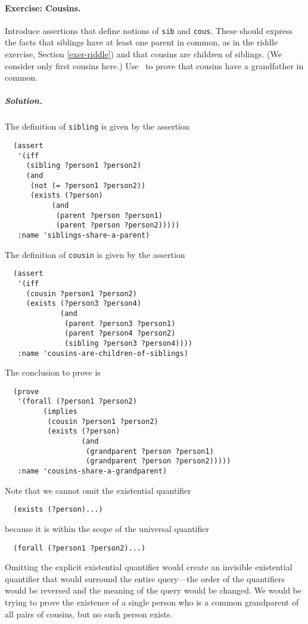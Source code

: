 \paragraph{Exercise: Cousins.}
\label{exer-cousins}
Introduce assertions that define notions of {\tt sib} and
{\tt cous}.  These should express the facts that siblings
have at least one parent in common, as in the riddle
exercise, Section \ref{exer-riddle}) and that cousins are children of
siblings.  (We consider only first cousins here.)
Use \snark\  to prove that cousins have a grandfather in common.
\subparagraph{Solution.}  The definition of {\tt sibling} is given by the
assertion
\begin{verbatim}
  (assert
   '(iff
     (sibling ?person1 ?person2)
     (and
      (not (= ?person1 ?person2))
      (exists (?person)
           (and
            (parent ?person ?person1)
            (parent ?person ?person2)))))
   :name 'siblings-share-a-parent)
\end{verbatim}
The definition of {\tt cousin} is given by the assertion
\begin{verbatim}
  (assert
   '(iff
     (cousin ?person1 ?person2)
     (exists (?person3 ?person4)
             (and
              (parent ?person3 ?person1)
              (parent ?person4 ?person2)
              (sibling ?person3 ?person4))))
   :name 'cousins-are-children-of-siblings)
\end{verbatim}
The conclusion to prove is
\begin{verbatim}
  (prove
   '(forall (?person1 ?person2)
         (implies
          (cousin ?person1 ?person2)
          (exists (?person)
                  (and
                   (grandparent ?person ?person1)
                   (grandparent ?person ?person2)))))
   :name 'cousins-share-a-grandparent)
\end{verbatim}

Note that we cannot omit the existential quantifier
\begin{verbatim}
  (exists (?person)...)
\end{verbatim}
because it is
within the scope of the universal quantifier
\begin{verbatim}
  (forall (?person1 ?person2)...)
\end{verbatim}
Omitting the explicit existential quantifier would create an invisible
existential quantifier that would surround the entire query---the
order of the quantifiers would be reversed and the meaning of the
query would be changed.  We would be trying to prove the existence of
a single person who is a common grandparent of all pairs of cousins,
but no such person exists.

